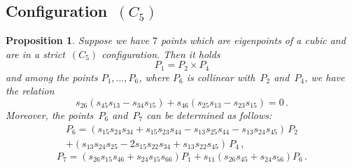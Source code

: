 \documentclass[a4paper, 11pt, reqno]{amsart}
\theoremstyle{plain}
\newtheorem{prop}[lemma]{Proposition}
\theoremstyle{definition}
\begin{document}
\subsection*{Configuration~\texorpdfstring{$(C_5)$}{C5}} 
\begin{prop}
\label{proposition:condition_5}
Suppose we have $7$ points which are eigenpoints of a cubic and are in a strict~$(C_5)$ configuration.
Then it holds
%
\[
  P_1 = P_2 \times P_4 
\]
%
and among the points $P_1, \dots, P_6$, where $P_6$ is collinear with~$P_2$ and~$P_4$, we have the relation
%
\begin{equation}
\label{cndC5}
  s_{26}(s_{45}s_{13}-s_{34}s_{15})+s_{46}(s_{25}s_{13}-s_{23}s_{15}) = 0 \,.
\end{equation}
%
Moreover, the points~$P_6$ and~$P_7$ can be determined as follows:
%
\begin{equation}
\label{p6formula}
\begin{multlined}
  P_6 = (s_{15}s_{24}s_{34}+s_{15}s_{23}s_{44} -s_{13}s_{25}s_{44} -s_{13}s_{24}s_{45}) \, P_2 \\ + (s_{13}s_{24}s_{25}-2s_{15}s_{22}s_{34}+s_{13}s_{22}s_{45}) \, P_4 \,, 
\end{multlined}
\end{equation}
%
\begin{equation}
\label{p7formula}
P_7 = (s_{26}s_{15}s_{46}+s_{24}s_{15}s_{66})P_1 + s_{11}(s_{26}s_{45}+s_{24}s_{56})P_6\,.
\end{equation}
%
\end{prop}
\end{document}
